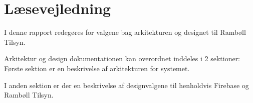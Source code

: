 \chapter*{Læsevejledning}
I denne rapport redegøres for valgene bag arkitekturen og designet til Rambøll Tilsyn. 

Arkitektur og design dokumentationen kan overordnet inddeles i 2 sektioner:\\
Første sektion er en beskrivelse af arkitekturen for systemet.

I anden sektion er der en beskrivelse af designvalgene til henholdvis Firebase og Rambøll Tilsyn.
